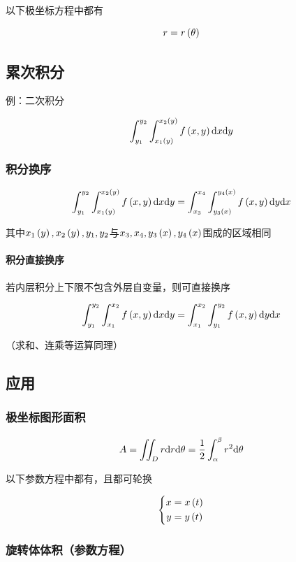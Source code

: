 \documentclass{article}
\begin{document}
以下极坐标方程中都有

\[r=r\left(\theta\right)\]

\subsection{累次积分}

例：二次积分

\[\int_{y_1}^{y_2}\int_{x_1\left(y\right)}^{x_2\left(y\right)}f\left(x,y\right)\mathrm d x\mathrm d y\]

\subsubsection{积分换序}

\[\int_{y_1}^{y_2}\int_{x_1\left(y\right)}^{x_2\left(y\right)}f\left(x,y\right)\mathrm d x\mathrm d y=\int_{x_3}^{x_4}\int_{y_3\left(x\right)}^{y_4\left(x\right)}f\left(x,y\right)\mathrm d y\mathrm d x\]

其中$x_1\left(y\right),x_2\left(y\right),y_1,y_2$与$x_3,x_4,y_3\left(x\right),y_4\left(x\right)$围成的区域相同

\paragraph{积分直接换序}

若内层积分上下限不包含外层自变量，则可直接换序

\[\int_{y_1}^{y_2}\int_{x_1}^{x_2}f\left(x,y\right)\mathrm d x\mathrm d y=\int_{x_1}^{x_2}\int_{y_1}^{y_2}f\left(x,y\right)\mathrm d y\mathrm d x\]

（求和、连乘等运算同理）

\subsection{应用}

\subsubsection{极坐标图形面积}

\[A=\iint_Dr\mathrm d r\mathrm d\theta=\frac12\int_{\alpha}^{\beta}{r^2\mathrm d\theta}\]

以下参数方程中都有，且都可轮换

\[\left\{\begin{aligned}
        x & =x\left(t\right) \\
        y & =y\left(t\right)
    \end{aligned}\right.\]

\subsubsection{旋转体体积（参数方程）}
\end{document}
